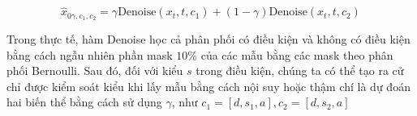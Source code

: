 \begin{equation} \label{eq:denoise}
\hat{x}_{0 \gamma, c_{1}, c_{2}}=\gamma \text{Denoise} \left(x_{t}, t, c_{1}\right)+(1-\gamma) \text{Denoise} \left(x_{t}, t, c_{2}\right)
\end{equation}


Trong thực tế, hàm Denoise học cả phân phối có điều kiện và không có điều kiện bằng cách ngẫu nhiên phần mask $10 \%$ của các mẫu bằng các mask theo phân phối Bernoulli. Sau đó, đối với kiểu $s$ trong điều kiện, chúng ta có thể tạo ra cử chỉ được kiểm soát kiểu khi lấy mẫu bằng cách nội suy hoặc thậm chí là dự đoán hai biến thể bằng cách sử dụng $\gamma$, như $c_{1}=\left[d, s_{1}, a\right], c_{2}=\left[d, s_{2}, a\right]$




